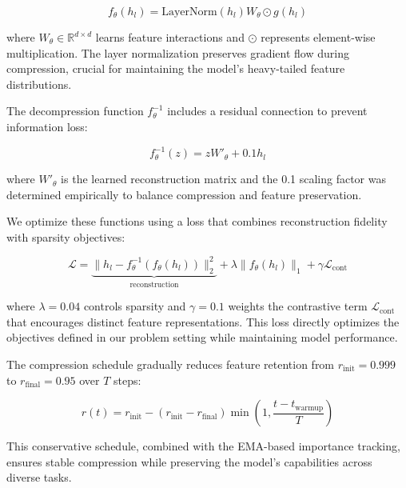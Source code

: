 \documentclass{article} %
\begin{document}
\begin{equation}
    f_\theta(h_l) = \text{LayerNorm}(h_l)W_\theta \odot g(h_l)
\end{equation}

where $W_\theta \in \mathbb{R}^{d \times d}$ learns feature interactions and $\odot$ represents element-wise multiplication. The layer normalization preserves gradient flow during compression, crucial for maintaining the model's heavy-tailed feature distributions.

The decompression function $f^{-1}_\theta$ includes a residual connection to prevent information loss:

\begin{equation}
    f^{-1}_\theta(z) = zW'_\theta + 0.1h_l
\end{equation}

where $W'_\theta$ is the learned reconstruction matrix and the 0.1 scaling factor was determined empirically to balance compression and feature preservation.

We optimize these functions using a loss that combines reconstruction fidelity with sparsity objectives:

\begin{equation}
    \mathcal{L} = \underbrace{\|h_l - f^{-1}_\theta(f_\theta(h_l))\|_2^2}_\text{reconstruction} + \lambda\|f_\theta(h_l)\|_1 + \gamma\mathcal{L}_\text{cont}
\end{equation}

where $\lambda=0.04$ controls sparsity and $\gamma=0.1$ weights the contrastive term $\mathcal{L}_\text{cont}$ that encourages distinct feature representations. This loss directly optimizes the objectives defined in our problem setting while maintaining model performance.

The compression schedule gradually reduces feature retention from $r_\text{init}=0.999$ to $r_\text{final}=0.95$ over $T$ steps:

\begin{equation}
    r(t) = r_\text{init} - (r_\text{init} - r_\text{final})\min(1, \frac{t - t_\text{warmup}}{T})
\end{equation}

This conservative schedule, combined with the EMA-based importance tracking, ensures stable compression while preserving the model's capabilities across diverse tasks.
\end{document}
